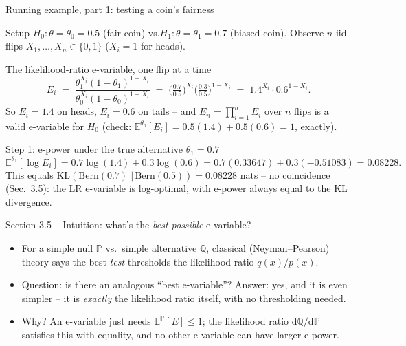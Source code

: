 \documentclass[aspectratio=169,10pt]{beamer}
\newcommand{\PP}{\mathbb{P}}
\newcommand{\QQ}{\mathbb{Q}}
\newcommand{\EE}{\mathbb{E}}
\newcommand{\KL}[2]{\mathrm{KL}(#1 \,\Vert\, #2)}
\begin{document}
\begin{frame}{Running example, part 1: testing a coin's fairness}
  \begin{block}{Setup}
    $H_0: \theta=\theta_0=0.5$ (fair coin) \quad vs.\quad $H_1: \theta=\theta_1=0.7$ (biased coin).
    Observe $n$ iid flips $X_1,\dots,X_n\in\{0,1\}$ ($X_i=1$ for heads).
  \end{block}
  \begin{block}{The likelihood-ratio e-variable, one flip at a time}
    \[
      E_i \;=\; \frac{\theta_1^{X_i}(1-\theta_1)^{1-X_i}}{\theta_0^{X_i}(1-\theta_0)^{1-X_i}}
      \;=\; \Big(\tfrac{0.7}{0.5}\Big)^{X_i}\Big(\tfrac{0.3}{0.5}\Big)^{1-X_i}
      \;=\; 1.4^{X_i}\cdot 0.6^{1-X_i}.
    \]
    So $E_i = 1.4$ on heads, $E_i=0.6$ on tails -- and $E_n=\prod_{i=1}^n E_i$ over $n$ flips is a valid e-variable for $H_0$ (check: $\EE^{\theta_0}[E_i] = 0.5(1.4)+0.5(0.6)=1$, exactly).
  \end{block}
  \begin{block}{Step 1: e-power under the true alternative $\theta_1=0.7$}
    \[
      \EE^{\theta_1}[\log E_i] = 0.7\log(1.4) + 0.3\log(0.6) = 0.7(0.33647) + 0.3(-0.51083) = 0.08228.
    \]
    This equals $\KL{\mathrm{Bern}(0.7)}{\mathrm{Bern}(0.5)}=0.08228$ nats -- no coincidence (Sec.\ 3.5): the LR e-variable is log-optimal, with e-power always equal to the KL divergence.
  \end{block}
\end{frame}

\begin{frame}{Section 3.5 -- Intuition: what's the \emph{best possible} e-variable?}
  \begin{itemize}
    \item For a simple null $\PP$ vs.\ simple alternative $\QQ$, classical (Neyman--Pearson) theory says the best \emph{test} thresholds the likelihood ratio $q(x)/p(x)$.
    \item Question: is there an analogous ``best e-variable''? Answer: yes, and it is even simpler -- it is \emph{exactly} the likelihood ratio itself, with no thresholding needed.
    \item Why? An e-variable just needs $\EE^\PP[E]\le 1$; the likelihood ratio $\mathrm{d}\QQ/\mathrm{d}\PP$ satisfies this with equality, and no other e-variable can have larger e-power.
  \end{itemize}
\end{frame}
\end{document}

